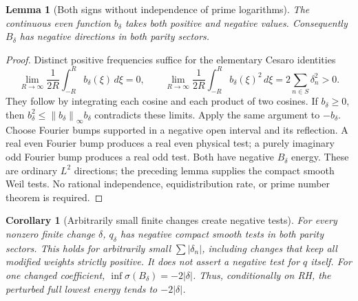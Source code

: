 \documentclass[11pt]{article}
\newtheorem{lemma}[theorem]{Lemma}
\newtheorem{corollary}[theorem]{Corollary}
\newcommand{\norm}[1]{\left\|#1\right\|}
\begin{document}
\begin{lemma}[Both signs without independence of prime logarithms]
The continuous even function $b_\delta$ takes both positive and negative
values. Consequently $B_\delta$ has negative directions in both parity sectors.
\end{lemma}
\begin{proof}
Distinct positive frequencies suffice for the elementary Cesaro identities
\[
 \lim_{R\to\infty}\frac1{2R}\int_{-R}^R b_\delta(\xi)\,d\xi=0,
 \qquad
 \lim_{R\to\infty}\frac1{2R}\int_{-R}^R b_\delta(\xi)^2\,d\xi
       =2\sum_{n\in S}\delta_n^2>0.
\]
They follow by integrating each cosine and each product of two cosines.
If $b_\delta\ge0$, then $b_\delta^2\le\norm{b_\delta}_\infty b_\delta$
contradicts these limits. Apply the same argument to $-b_\delta$.
Choose Fourier bumps supported in a negative open interval and its
reflection. A real even Fourier bump produces a real even physical
test; a purely imaginary odd Fourier bump produces a real odd test.
Both have negative $B_\delta$ energy. These are ordinary $L^2$
directions; the preceding lemma supplies the compact smooth Weil tests.
No rational independence, equidistribution rate, or prime number theorem
is required.
\end{proof}

\begin{corollary}[Arbitrarily small finite changes create negative tests]
For every nonzero finite change $\delta$, $q_\delta$ has negative compact
smooth tests in both parity sectors. This holds for arbitrarily small
$\sum|\delta_n|$, including changes that keep all modified weights
strictly positive. It does not assert a negative test for $q$ itself.
For one changed coefficient, $\inf\sigma(B_\delta)=-2|\delta|$.
Thus, conditionally on RH, the perturbed full lowest energy tends
to $-2|\delta|$.
\end{corollary}
\end{document}
